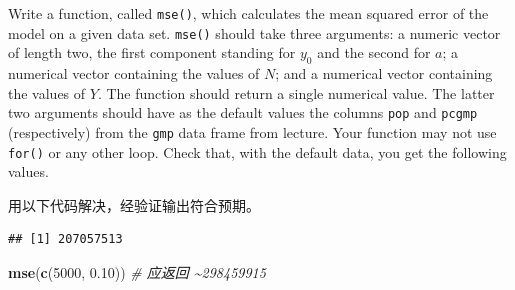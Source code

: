 \documentclass[
]{article}
\newenvironment{Shaded}{\begin{snugshade}}{\end{snugshade}}
\newcommand{\AttributeTok}[1]{\textcolor[rgb]{0.13,0.29,0.53}{#1}}
\newcommand{\CommentTok}[1]{\textcolor[rgb]{0.56,0.35,0.01}{\textit{#1}}}
\newcommand{\ControlFlowTok}[1]{\textcolor[rgb]{0.13,0.29,0.53}{\textbf{#1}}}
\newcommand{\DecValTok}[1]{\textcolor[rgb]{0.00,0.00,0.81}{#1}}
\newcommand{\FloatTok}[1]{\textcolor[rgb]{0.00,0.00,0.81}{#1}}
\newcommand{\FunctionTok}[1]{\textcolor[rgb]{0.13,0.29,0.53}{\textbf{#1}}}
\newcommand{\NormalTok}[1]{#1}
\newcommand{\OtherTok}[1]{\textcolor[rgb]{0.56,0.35,0.01}{#1}}
\newcommand{\SpecialCharTok}[1]{\textcolor[rgb]{0.81,0.36,0.00}{\textbf{#1}}}
\begin{document}
Write a function, called \texttt{mse()}, which calculates the mean
squared error of the model on a given data set. \texttt{mse()} should
take three arguments: a numeric vector of length two, the first
component standing for \(y_0\) and the second for \(a\); a numerical
vector containing the values of \(N\); and a numerical vector containing
the values of \(Y\). The function should return a single numerical
value. The latter two arguments should have as the default values the
columns \texttt{pop} and \texttt{pcgmp} (respectively) from the
\texttt{gmp} data frame from lecture. Your function may not use
\texttt{for()} or any other loop. Check that, with the default data, you
get the following values.

用以下代码解决，经验证输出符合预期。

\begin{Shaded}
\end{Shaded}

\begin{verbatim}
## [1] 207057513
\end{verbatim}

\begin{Shaded}
\begin{Highlighting}[]
\FunctionTok{mse}\NormalTok{(}\FunctionTok{c}\NormalTok{(}\DecValTok{5000}\NormalTok{, }\FloatTok{0.10}\NormalTok{))  }\CommentTok{\# 应返回 \textasciitilde{}298459915}
\end{Highlighting}
\end{Shaded}
\end{document}
